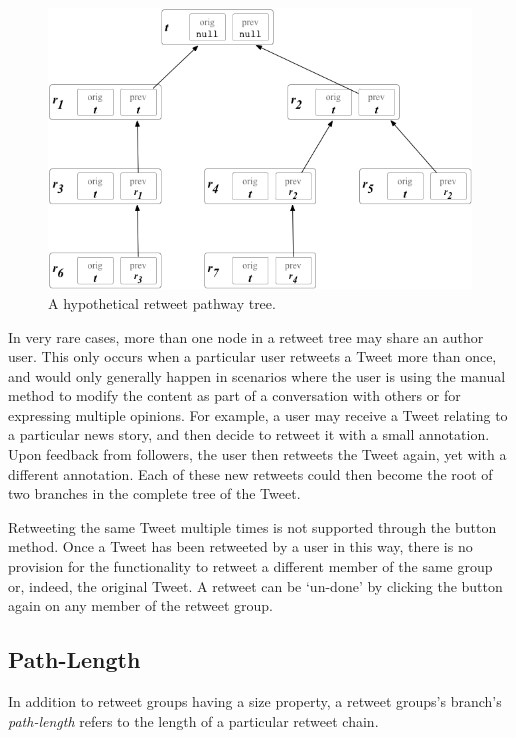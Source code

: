 \begin{figure}[h]
\centering
\includegraphics[scale=0.6]{3.Chapter1/Media/tree.png} 
\caption{A hypothetical retweet pathway tree.}
\label{fig:retweet_tree}
\end{figure}

In very rare cases, more than one node in a retweet tree may share an author user. This only occurs when a particular user retweets a Tweet more than once, and would only generally happen in scenarios where the user is using the manual method to modify the content as part of a conversation with others or for expressing multiple opinions. For example, a user may receive a Tweet relating to a particular news story, and then decide to retweet it with a small annotation. Upon feedback from followers, the user then retweets the Tweet again, yet with a different annotation. Each of these new retweets could then become the root of two branches in the complete tree of the Tweet.

Retweeting the same Tweet multiple times is not supported through the button method. Once a Tweet has been retweeted by a user in this way, there is no provision for the functionality to retweet a different member of the same group or, indeed, the original Tweet. A retweet can be `un-done' by clicking the button again on any member of the retweet group.


\subsection{Path-Length}
In addition to retweet groups having a size property, a retweet groups's branch's \textit{path-length} refers to the length of a particular retweet chain. 

